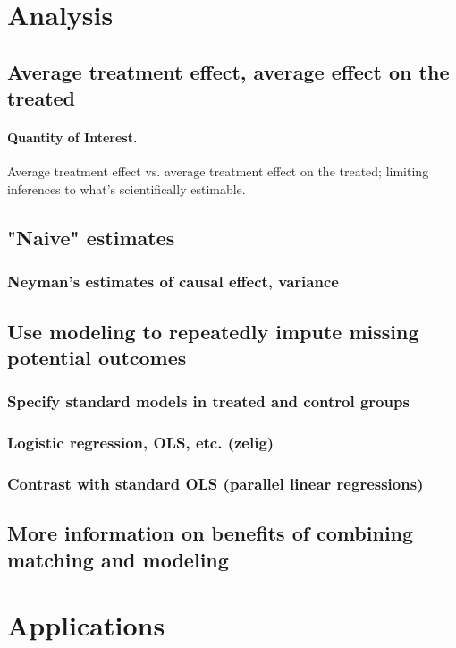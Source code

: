 \documentclass[11pt,titlepage]{article}
\begin{document}
\section{Analysis}
\subsection{Average treatment effect, average effect on the treated}
\paragraph{Quantity of Interest.} Average treatment effect vs. average
  treatment effect on the treated; limiting inferences to what's
  scientifically estimable. 

\subsection{"Naive" estimates}
\subsubsection{Neyman's estimates of causal effect, variance}
\subsection{Use modeling to repeatedly impute missing potential outcomes}
\subsubsection{Specify standard models in treated and control groups}
\subsubsection{Logistic regression, OLS, etc. (zelig)}
\subsubsection{Contrast with standard OLS (parallel linear regressions)}
\subsection{More information on benefits of combining matching and modeling}
                                                                                                                                                             
\section{Applications}
\end{document}
